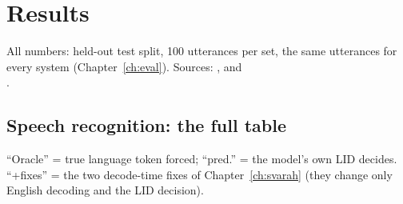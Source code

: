 \chapter{Results}
\label{ch:results}

All numbers: held-out test split, 100 utterances per set, the same utterances for every system (Chapter~\ref{ch:eval}).
Sources: ,  and\\ .

\section{Speech recognition: the full table}

``Oracle'' = true language token forced; ``pred.'' = the model's own LID decides. ``+fixes'' = the two decode-time fixes of
Chapter~\ref{ch:svarah} (they change only English decoding and the LID decision).

